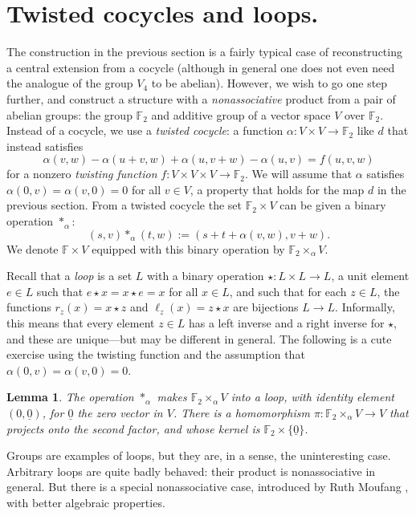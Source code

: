 \documentclass{article}
\theoremstyle{plain}
\newtheorem{lemma}{Lemma}
\theoremstyle{definition}
\def \FF {\mathbb{F}}
\begin{document}
\section{Twisted cocycles and loops.}

The construction in the previous section is a fairly typical case of reconstructing a central extension from a cocycle (although in general one does not even need the analogue of the group $V_4$ to be abelian). 
However, we wish to go one step further, and construct a structure with a \emph{nonassociative} product from a pair of abelian groups: the group $\FF_2$ and additive group of a vector space $V$ over $\FF_2$.
Instead of a cocycle, we use a \emph{twisted cocycle}: a function $\alpha\colon V\times V \to \FF_2$ like $d$ that instead satisfies
\[
	\alpha(v,w)-\alpha(u+v,w)+\alpha(u,v+w)-\alpha(u,v) = f(u,v,w)
\]
for a nonzero \emph{twisting function} $f\colon V\times V\times V \to \FF_2$. We will assume that $\alpha$ satisfies $\alpha(0,v)=\alpha(v,0) = 0$ for all $v\in V$, a property that holds for the map $d$ in the previous section. From a twisted cocycle the set $\FF_2 \times V$ can be given a binary operation $\ast_\alpha$:
\[
	(s,v)\ast_\alpha(t,w):=(s+ t+ \alpha(v,w),v+w).
\]
We denote $\FF \times V$ equipped with this binary operation by $\FF_2\times_\alpha V$.

Recall that a \emph{loop} is a set $L$ with a binary operation $\star\colon L\times L \to L$, a unit element $e\in L$ such that $e\star x = x \star e = x$ for all $x\in L$, and such that for each $z\in L$, the functions $r_z(x) = x \star z$ and $\ell_z(x)=z\star x$ are bijections $L\to L$. 
Informally, this means that every element $z\in L$ has a left inverse and a right inverse for $\star$, and these are unique---but may be different in general. 
The following is a cute exercise using the twisting function and the assumption that $\alpha(0,v)=\alpha(v,0)=0$.

\begin{lemma}
The operation $\ast_\alpha$ makes $\FF_2\times_\alpha V$ into a loop, with identity element $(0,\underline{0})$, for $\underline{0}$ the zero vector in $V$.
There is a homomorphism $\pi\colon \FF_2\times_\alpha V \to V$ that projects onto the second factor, and whose kernel is $\FF_2 \times\{\underline{0}\}$.
\end{lemma}

Groups are examples of loops, but they are, in a sense, the uninteresting case. 
Arbitrary loops are quite badly behaved: their product is nonassociative in general. 
But there is a special nonassociative case, introduced by Ruth Moufang \cite{Moufang}, with better algebraic properties.
\end{document}
